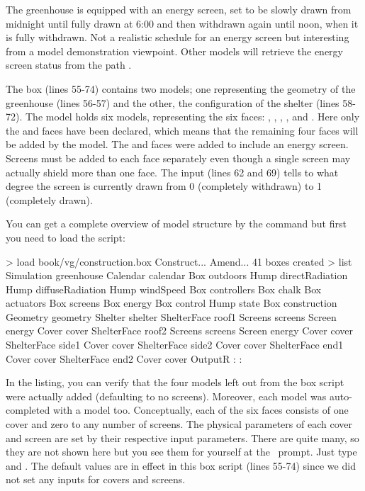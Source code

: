 The greenhouse is equipped with an energy screen, set to be slowly drawn from midnight until fully drawn at 6:00 and then withdrawn again until noon, when it is fully withdrawn. Not a realistic schedule for an energy screen but interesting from a model demonstration viewpoint. Other models will retrieve the energy screen status from the path .

The  box (lines 55-74) contains two models; one representing the geometry of the greenhouse (lines 56-57) and the other, the configuration of the shelter (lines 58-72). The  model holds six  models, representing the six faces: , , , ,  and . Here only the  and  faces have been declared, which means that the remaining four faces will be added by the  model. The  and  faces were added to include an energy screen. Screens must be added to each face separately even though a single screen may actually shield more than one face. The  input (lines 62 and 69) tells to what degree the screen is currently drawn from 0 (completely withdrawn) to 1 (completely drawn).

You can get a complete overview of model structure by the  command but first you need to load the script:
\begin{usdialog}
> load book/vg/construction.box
Construct...
Amend...
41 boxes created
> list
Simulation greenhouse
  Calendar calendar
  Box outdoors
    Hump directRadiation
    Hump diffuseRadiation
    Hump windSpeed
  Box controllers
    Box chalk
  Box actuators
    Box screens
      Box energy
        Box control
          Hump state
  Box construction
    Geometry geometry
    Shelter shelter
      ShelterFace roof1
        Screens screens
          Screen energy
        Cover cover
      ShelterFace roof2
        Screens screens
          Screen energy
        Cover cover
      ShelterFace side1
        Cover cover
      ShelterFace side2
        Cover cover
      ShelterFace end1
        Cover cover
      ShelterFace end2
        Cover cover
  OutputR 
		:
		:
\end{usdialog}

In the listing,  you can verify that the four  models left out from the box script were actually added (defaulting to no screens). Moreover, each  model was auto-completed with a  model too. Conceptually, each of the six faces consists of one cover and zero to any number of screens. The physical parameters of each cover and screen are set by their respective input parameters. There are quite many, so they are not shown here but you see them for yourself at the \US\ prompt. Just type  and . The default values are in effect in this box script (lines 55-74) since we did not set any inputs for covers and screens. 

